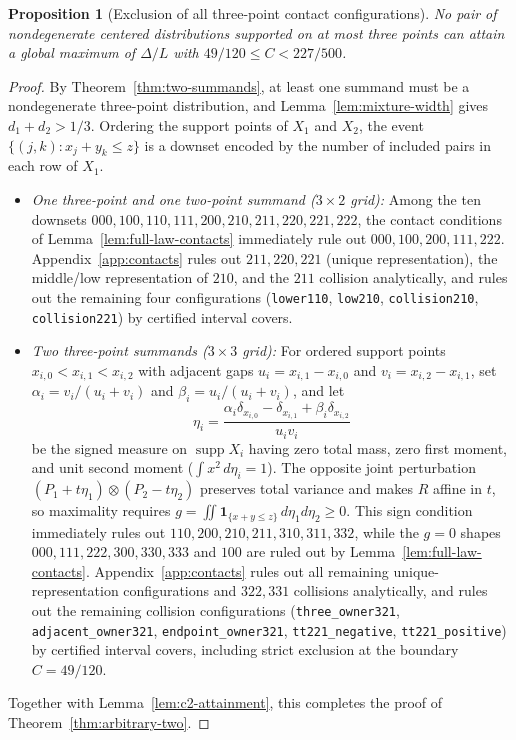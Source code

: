 \documentclass[11pt]{article}
\numberwithin{equation}{section}
\newtheorem{proposition}[theorem]{Proposition}
\theoremstyle{definition}
\theoremstyle{remark}
\DeclareMathOperator{\supp}{supp}
\newcommand{\ind}{\mathbf 1}
\begin{document}
\begin{proposition}[Exclusion of all three-point contact configurations]\label{prop:finite-contact-exclusion}
No pair of nondegenerate centered distributions supported on at most three
points can attain a global maximum of $\Delta/L$ with $49/120\le C<227/500$.
\end{proposition}
\begin{proof}
By Theorem~\ref{thm:two-summands}, at least one summand must be a
nondegenerate three-point distribution, and Lemma~\ref{lem:mixture-width}
gives $d_1+d_2>1/3$. Ordering the support points of $X_1$ and $X_2$, the event
$\{(j,k):x_j+y_k\le z\}$ is a downset encoded by the number of included pairs
in each row of $X_1$.
\begin{itemize}[leftmargin=2em]
\item \emph{One three-point and one two-point summand ($3\times2$ grid):}
Among the ten downsets $000,100,110,111,200,210,211,220,221,222$, the contact
conditions of Lemma~\ref{lem:full-law-contacts} immediately rule out $000,100,200,111,222$.
Appendix~\ref{app:contacts} rules out $211,220,221$ (unique representation),
the middle/low representation of $210$, and the $211$ collision analytically,
and rules out the remaining four configurations (\texttt{lower110}, \texttt{low210},
\texttt{collision210}, \texttt{collision221}) by certified interval covers.
\item \emph{Two three-point summands ($3\times3$ grid):}
For ordered support points $x_{i,0}<x_{i,1}<x_{i,2}$ with adjacent gaps
$u_i=x_{i,1}-x_{i,0}$ and $v_i=x_{i,2}-x_{i,1}$, set
$\alpha_i=v_i/(u_i+v_i)$ and $\beta_i=u_i/(u_i+v_i)$, and let
\[
 \eta_i=\frac{\alpha_i\delta_{x_{i,0}}-\delta_{x_{i,1}}
                 +\beta_i\delta_{x_{i,2}}}{u_iv_i}
\]
be the signed measure on $\supp X_i$ having zero total mass, zero first
moment, and unit second moment ($\int x^2\,d\eta_i=1$). The opposite joint
perturbation $(P_1+t\eta_1)\otimes(P_2-t\eta_2)$ preserves total variance and
makes $R$ affine in $t$, so maximality requires
$g=\iint\ind_{\{x+y\le z\}}\,d\eta_1d\eta_2\ge0$. This sign condition
immediately rules out $110,200,210,211,310,311,332$, while the $g=0$ shapes
$000,111,222,300,330,333$ and $100$ are ruled out by Lemma~\ref{lem:full-law-contacts}.
Appendix~\ref{app:contacts} rules out all remaining unique-representation
configurations and $322,331$ collisions analytically, and rules out the
remaining collision configurations (\texttt{three\_owner321},
\texttt{adjacent\_owner321}, \texttt{endpoint\_owner321}, \texttt{tt221\_negative},
\texttt{tt221\_positive}) by certified interval covers, including strict
exclusion at the boundary $C=49/120$.
\end{itemize}
Together with Lemma~\ref{lem:c2-attainment}, this completes the proof of
Theorem~\ref{thm:arbitrary-two}.
\end{proof}
\end{document}
